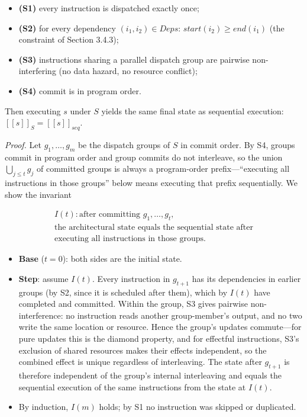 \documentclass[
  11pt,
]{article}
\providecommand{\tightlist}{%
  \setlength{\itemsep}{0pt}\setlength{\parskip}{0pt}}
\newcommand{\llbracket}{[\![}
\newcommand{\rrbracket}{]\!]}
\begin{document}
\begin{itemize}
\tightlist
\item
  \textbf{(S1)} every instruction is dispatched exactly once;
\item
  \textbf{(S2)} for every dependency \((i_1, i_2) \in Deps\):
  \(start(i_2) \geq end(i_1)\) (the constraint of Section 3.4.3);
\item
  \textbf{(S3)} instructions sharing a parallel dispatch group are
  pairwise non-interfering (no data hazard, no resource conflict);
\item
  \textbf{(S4)} commit is in program order.
\end{itemize}

Then executing \(s\) under \(S\) yields the same final state as
sequential execution:
\(\llbracket s \rrbracket_S = \llbracket s \rrbracket_{seq}\).

\emph{Proof.} Let \(g_1, \dots, g_m\) be the dispatch groups of \(S\) in
commit order. By S4, groups commit in program order and group commits do
not interleave, so the union \(\bigcup_{j \leq t} g_j\) of committed
groups is always a program-order prefix---``executing all instructions
in those groups'' below means executing that prefix sequentially. We
show the invariant

\[\begin{gathered} I(t): \text{after committing } g_1, \dots, g_t,\\ \text{the architectural state equals the sequential state after}\\ \text{executing all instructions in those groups.}\end{gathered}\]

\begin{itemize}
\tightlist
\item
  \textbf{Base} (\(t = 0\)): both sides are the initial state.
\item
  \textbf{Step}: assume \(I(t)\). Every instruction in \(g_{t+1}\) has
  its dependencies in earlier groups (by S2, since it is scheduled after
  them), which by \(I(t)\) have completed and committed. Within the
  group, S3 gives pairwise non-interference: no instruction reads
  another group-member's output, and no two write the same location or
  resource. Hence the group's updates commute---for pure updates this is
  the diamond property, and for effectful instructions, S3's exclusion
  of shared resources makes their effects independent, so the combined
  effect is unique regardless of interleaving. The state after
  \(g_{t+1}\) is therefore independent of the group's internal
  interleaving and equals the sequential execution of the same
  instructions from the state at \(I(t)\).
\item
  By induction, \(I(m)\) holds; by S1 no instruction was skipped or
  duplicated.
\end{itemize}
\end{document}
